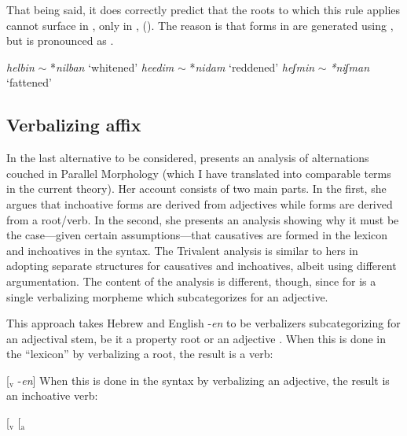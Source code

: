 \begin{exe}
\begin{xlist}
\begin{xlist}
\begin{exe}
\begin{exe}
\begin{xlist}
\begin{exe}
\begin{xlist}
\begin{exe}
\begin{xlist}
\begin{xlist}
\begin{exe}
\begin{xlist}
\begin{exe}
\begin{xlist}
\begin{exe}
\begin{exe}
\begin{exe}
\begin{xlist}
\begin{exe}
\begin{exe}
\begin{xlist}
\begin{xlist}
\begin{exe}
\begin{xlist}
\begin{exe}
\begin{exe}
\begin{exe}
\begin{xlist}
\begin{exe}
\begin{exe}
\begin{xlist}
\begin{exe}
\begin{xlist}
\begin{exe}
\begin{xlist}
\begin{exe}
\begin{xlist}
\begin{exe}
\begin{exe}
\begin{xlist}
\begin{exe}
\begin{exe}
\begin{xlist}
\begin{xlist}
\begin{exe}
\begin{xlist}
\begin{xlist}
\begin{exe}
\begin{xlist}
\begin{exe}
\begin{xlist}
\begin{exe}
\begin{xlist}
\begin{exe}
\begin{xlist}
\begin{exe}
\begin{exe}
\begin{exe}
\begin{exe}
\begin{xlist}
\begin{exe}
\begin{exe}
\begin{xlist}
\begin{xlist}
\begin{exe}
\begin{exe}
\begin{xlist}
\begin{exe}
\begin{xlist}
\begin{exe}
\begin{xlist}
\begin{exe}
\begin{xlist}
That being said, it does correctly predict that the roots to which this rule applies cannot surface in {\tnif}, only in {\thit}, (\nextx). The reason is that forms in {\tnif} are generated using {\vz}, but {\vz} is pronounced as {\thif}.
 \begin{exe}
\ex \label{ex:vd:allo-pred} 
	\begin{xlist}
		\ex  \emph{helbin} $\sim$ *\emph{nilban} `whitened' 
		\ex \emph{heedim} $\sim$ *\emph{nidam} `reddened'
		\ex \emph{heʃmin} $\sim$ \emph{*niʃman} `fattened'
	\z
 \z 

	\subsection{Verbalizing affix} \label{vd:others:borer}
In the last alternative to be considered, \cite{borer91} presents an analysis of {\thif} alternations couched in Parallel Morphology (which I have translated into comparable terms in the current theory). Her account consists of two main parts. In the first, she argues that inchoative forms are derived from adjectives while  forms are derived from a root/verb. In the second, she presents an analysis showing why it must be the case---given certain assumptions---that causatives are formed in the lexicon and inchoatives in the syntax. The Trivalent analysis is similar to hers in adopting separate structures for causatives and inchoatives, albeit using different argumentation. The content of the analysis is different, though, since for \cite{borer91} {\thif} is a single verbalizing morpheme which subcategorizes for an adjective.

This approach takes Hebrew {\thif} and English -\emph{en} to be verbalizers subcategorizing for an adjectival stem, be it a property root or an adjective \citep[136]{borer91}. 
When this is done in the ``lexicon'' by verbalizing a root, the result is a  verb:
 \begin{exe}
\ex \label{ex:vd:thif-borer-caus}{[}$_{\text{v}}$  -\emph{en}] 
 \z 
When this is done in the syntax by verbalizing an adjective, the result is an inchoative verb:
 \begin{exe}
\ex \label{ex:vd:thif-borer-inch}{[}$_{\text{v}}$ [$_{\text{a}}$ 
\end{exe}
\end{exe}
\end{xlist}
\end{exe}
\end{xlist}
\end{exe}
\end{xlist}
\end{exe}
\end{xlist}
\end{exe}
\end{xlist}
\end{exe}
\end{exe}
\end{xlist}
\end{xlist}
\end{exe}
\end{exe}
\end{xlist}
\end{exe}
\end{exe}
\end{exe}
\end{exe}
\end{xlist}
\end{exe}
\end{xlist}
\end{exe}
\end{xlist}
\end{exe}
\end{xlist}
\end{exe}
\end{xlist}
\end{xlist}
\end{exe}
\end{xlist}
\end{xlist}
\end{exe}
\end{exe}
\end{xlist}
\end{exe}
\end{exe}
\end{xlist}
\end{exe}
\end{xlist}
\end{exe}
\end{xlist}
\end{exe}
\end{xlist}
\end{exe}
\end{exe}
\end{xlist}
\end{exe}
\end{exe}
\end{exe}
\end{xlist}
\end{exe}
\end{xlist}
\end{xlist}
\end{exe}
\end{exe}
\end{xlist}
\end{exe}
\end{exe}
\end{exe}
\end{xlist}
\end{exe}
\end{xlist}
\end{exe}
\end{xlist}
\end{xlist}
\end{exe}
\end{xlist}
\end{exe}
\end{xlist}
\end{exe}
\end{exe}
\end{xlist}
\end{xlist}
\end{exe}
